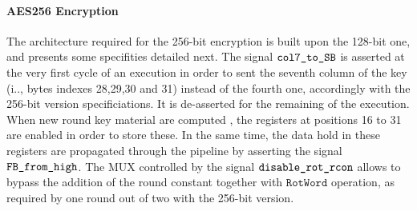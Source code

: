 \documentclass{scrartcl}
\begin{document}
\paragraph{AES256 Encryption}The architecture required for the 256-bit encryption is built upon the 128-bit
one, and presents some specifities detailed next. The signal
$\texttt{col7\_to\_SB}$ is asserted at the very first cycle of an execution in
order to sent the seventh column of the key (i.., bytes indexes 28,29,30 and
31) instead of the fourth one, accordingly with the 256-bit version
specificiations. It is de-asserted for the remaining of the execution. When new
round key material are computed , the registers at positions 16 to 31 are
enabled in order to store these. In the same time, the data hold in these
registers are propagated through the pipeline by asserting the signal
$\texttt{FB\_from\_high}$. The MUX controlled by the signal $\texttt{disable\_rot\_rcon}$
allows to bypass the addition of the round constant together with
$\texttt{RotWord}$ operation, as required by one round out of two with the
256-bit version. 
\end{document}
